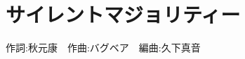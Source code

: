 \section{サイレントマジョリティー}

\begin{center}
    \scriptsize{
        作詞:秋元康　作曲:バグベア　編曲:久下真音
    }
\end{center}

\vspace{0.7em}

\begin{Parallel}[c]{0.47\textwidth}{0.47\textwidth}

\ParallelLText{
    \footnotesize{
        
    }
}

\ParallelRText{
    \footnotesize{
        
    }
}

\end{Parallel}
